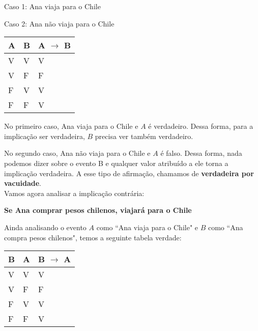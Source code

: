 \begin{center}

Caso 1: Ana viaja para o Chile 

Caso 2: Ana não viaja para o Chile

\end{center}

\begin{table}[htb]
\centering
\begin{tabular}{|l|l|l|}
\hline

\textbf{A} & \textbf{B} & \textbf{A $\to$ B} \\ \hline
V          & V          & V                  \\ \hline
V          & F          & F                  \\ \hline
F          & V          & V                  \\ \hline
F          & F          & V                  \\ \hline

\end{tabular}
\end{table}

No primeiro caso, Ana viaja para o Chile e $A$ é verdadeiro. Dessa forma, para a implicação ser verdadeira, $B$ precisa ver também verdadeiro.

No segundo caso, Ana não viaja para o Chile e $A$ é falso.
Dessa forma, nada podemos dizer sobre o evento B e qualquer valor atribuído a ele torna a implicação verdadeira. A esse tipo de afirmação, chamamos de \textbf{verdadeira por vacuidade}.\\

Vamos agora analisar a implicação contrária:
\begin{center}

\textbf{Se Ana comprar pesos chilenos, viajará para o Chile}

\end{center}
Ainda analisando o evento $A$ como ``Ana viaja para o Chile" e $B$ como ``Ana compra pesos chilenos", temos a seguinte tabela verdade:

\begin{table}[htb]
\centering
\begin{tabular}{|l|l|l|}
\hline

\textbf{B} & \textbf{A} & \textbf{B $\to$ A} \\ \hline
V          & V          & V                  \\ \hline
V          & F          & F                  \\ \hline
F          & V          & V                  \\ \hline
F          & F          & V                  \\ \hline

\end{tabular}
\end{table}

